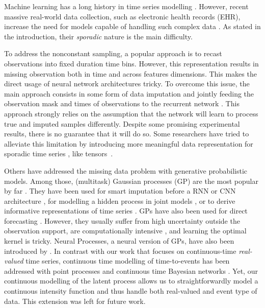 \documentclass{article}
\begin{document}
Machine learning has a long history in time series modelling \citep{mitchell1999machine,gers2000learning,wang2006gaussian,chung2014empirical}. However, recent massive real-world data collection, such as electronic health records (EHR), increase the need for models capable of handling such complex data \citep{lee2017big}. As stated in the introduction, their \emph{sporadic} nature is the main difficulty. 

To address the nonconstant sampling, a popular approach is to recast observations into fixed duration time bins. However, this representation results in missing observation both in time and across features dimensions. This makes the direct usage of neural network architectures tricky. To overcome this issue, the main approach consists in some form of data imputation and jointly feeding the observation mask and times of observations to the recurrent network \citep{che2018recurrent,choi2016doctor,lipton2016directly,du2016recurrent,choi2016retain,BRITS}. This approach strongly relies on the assumption that the network will learn to process true and imputed samples differently. Despite some promising experimental results, there is no guarantee that it will do so. Some researchers have tried to alleviate this limitation by introducing more meaningful data representation for sporadic time series   \citep{rajkomar2018scalable,razavian2015temporal,ghassemi2015multivariate}, like tensors~\citep{de2018deep,simm2017macau}. 

Others have addressed the missing data problem with generative probabilistic models. Among those, (multitask) Gaussian processes (GP) are the most popular by far \citep{bonilla2008multi}. They have been used for smart imputation before a RNN or CNN architecture \citep{futoma2017learning, moor2019temporal}, for modelling a hidden process in joint models \citep{soleimani2018scalable}, or to derive informative representations of time series \citep{ghassemi2015multivariate}. GPs have also been used for direct forecasting \citep{cheng2017sparse}. However, they usually suffer from high uncertainty outside the observation support, are computationally intensive \citep{quinonero2005unifying}, and learning the optimal kernel is tricky. Neural Processes, a neural version of GPs, have also been introduced by \citet{garnelo2018neural}. In contrast with our work that focuses on continuous-time \emph{real-valued} time series, continuous time modelling of time-to-events has been addressed with point processes \citep{mei2017neural} and continuous time Bayesian networks \citep{nodelman2002continuous}. Yet, our continuous modelling of the latent process allows us to straightforwardly model a continuous intensity function and thus handle both real-valued and event type of data. This extension was left for future work.
\end{document}
